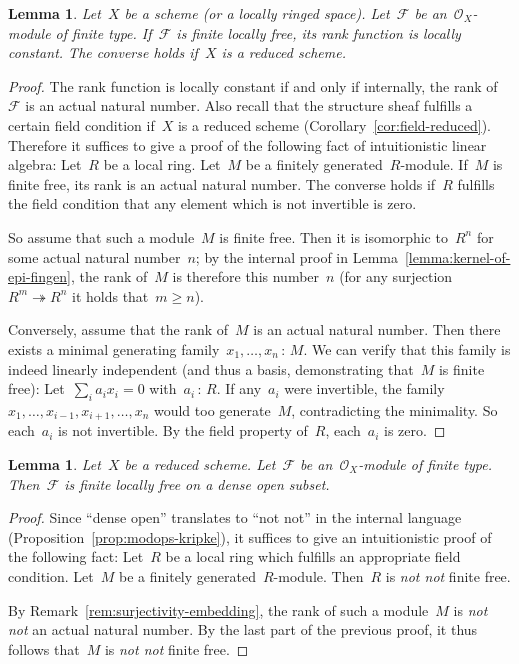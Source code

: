 \documentclass[10pt]{amsart}
\theoremstyle{definition}
\theoremstyle{plain}
\newtheorem{lemma}[defn]{Lemma}
\theoremstyle{remark}
\newcommand{\F}{\mathcal{F}}
\renewcommand{\O}{\mathcal{O}}
\newcommand{\?}{\,{:}\,}
\renewcommand{\_}{\mathpunct{.}\,}
\newcommand{\notnot}{\emph{not not}\xspace}
\begin{document}
\begin{lemma}Let~$X$ be a scheme (or a locally ringed space). Let~$\F$ be an~$\O_X$-module of
finite type. If~$\F$ is finite locally free, its rank function is locally
constant. The converse holds if~$X$ is a reduced scheme.
\end{lemma}
\begin{proof}The rank function is locally constant if and only if internally,
the rank of~$\F$ is an actual natural number. Also recall that the structure
sheaf fulfills a certain field condition if~$X$ is a reduced
scheme (Corollary~\ref{cor:field-reduced}). Therefore it suffices to give a
proof of the following fact of intuitionistic linear algebra: Let~$R$ be a
local ring. Let~$M$ be a finitely generated~$R$-module. If~$M$ is finite
free, its rank is an actual natural number. The converse holds if~$R$ fulfills
the field condition that any element which is not invertible is zero.

So assume that such a module~$M$ is finite free. Then it is isomorphic
to~$R^n$ for some actual natural number~$n$; by the internal proof in
Lemma~\ref{lemma:kernel-of-epi-fingen}, the rank of~$M$ is therefore this
number~$n$ (for any surjection~$R^m \twoheadrightarrow R^n$ it holds that~$m
\geq n$).

Conversely, assume that the rank of~$M$ is an actual natural number. Then
there exists a minimal generating family~$x_1,\ldots,x_n\?M$. We can verify that this family is
indeed linearly independent (and thus a basis, demonstrating that~$M$ is finite
free): Let~$\sum_i a_i x_i = 0$ with~$a_i\?R$. If any~$a_i$ were
invertible, the family~$x_1,\ldots,x_{i-1},x_{i+1},\ldots,x_n$ would too
generate~$M$, contradicting the minimality. So each~$a_i$ is not invertible.
By the field property of~$R$, each~$a_i$ is zero.
\end{proof}

\begin{lemma}\label{lemma:locally-free-dense}
Let~$X$ be a reduced scheme. Let~$\F$ be an~$\O_X$-module of
finite type. Then~$\F$ is finite locally free on a dense open subset.\end{lemma}
\begin{proof}Since ``dense open'' translates to ``not not'' in the internal
language (Proposition~\ref{prop:modops-kripke}), it suffices to give an
intuitionistic proof of the following fact: Let~$R$ be a local ring which fulfills an
appropriate field condition. Let~$M$ be a finitely generated~$R$-module.
Then~$R$ is \notnot finite free.

By Remark~\ref{rem:surjectivity-embedding}, the rank of such a module~$M$ is
\notnot an actual natural number. By the last part of the
previous proof, it thus follows that~$M$ is \notnot finite free.
\end{proof}
\end{document}
